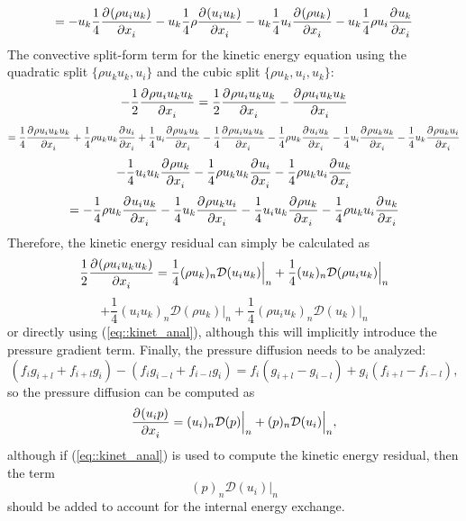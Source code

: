 \documentclass[12pt]{article}
\numberwithin{equation}{section}
\numberwithin{figure}{section}
\begin{document}
\begin{equation}
= -u_k\frac{1}{4}\frac{\partial^{} (\rho u_i u_k)}{\partial x_i^{}} -u_k\frac{1}{4}\rho\frac{\partial^{} (u_iu_k)}{\partial x_i^{}}
 -u_k\frac{1}{4}u_i\frac{\partial^{} (\rho u_k)}{\partial x_i^{}}
  -u_k\frac{1}{4}\rho u_i \frac{\partial^{} u_k}{\partial x_i^{}}
\end{equation}
\newcommand{\quadA}{\rho u_ku_k}
\newcommand{\quadB}{u_i}
\newcommand{\cubeA}{\rho u_k}
\newcommand{\cubeB}{u_i}
\newcommand{\cubeC}{u_k}
The convective split-form term for the kinetic energy equation using the quadratic split $\{\quadA{}, \quadB{}\}$ and the
cubic split $\{\cubeA{}, \cubeB{}, \cubeC{}\}$:
\begin{equation*}
-\frac{1}{2}\frac{\partial^{} \rho u_i u_k u_k}{\partial x_i^{}} = \frac{1}{2}\frac{\partial^{} \rho u_i u_k u_k}{\partial x_i^{}} - \frac{\partial^{} \rho u_i u_k u_k}{\partial x_i^{}}
\end{equation*}
\begin{equation*}
=\frac{1}{4}\pdv{\rho u_i u_k u_k}{x_i} + \frac{1}{4}\quadA{}\pdv{\quadB{}}{x_i} + \frac{1}{4}\quadB{}\pdv{\quadA{}}{x_i}
-\frac{1}{4}\pdv{\rho u_i u_k u_k}{x_i}
-\frac{1}{4}\cubeA{}\pdv{\cubeB{}\cubeC{}}{x_i}
-\frac{1}{4}\cubeB{}\pdv{\cubeA{}\cubeC{}}{x_i}
-\frac{1}{4}\cubeC{}\pdv{\cubeA{}\cubeB{}}{x_i}
\end{equation*}
\begin{equation*}
-\frac{1}{4}\cubeB{}\cubeC{}\pdv{\cubeA{}}{x_i}
-\frac{1}{4}\cubeA{}\cubeC{}\pdv{\cubeB{}}{x_i}
-\frac{1}{4}\cubeA{}\cubeB{}\pdv{\cubeC{}}{x_i}
\end{equation*}
\begin{equation}
=-\frac{1}{4}\cubeA{}\pdv{\cubeB{}\cubeC{}}{x_i}
-\frac{1}{4}\cubeC{}\pdv{\cubeA{}\cubeB{}}{x_i}
-\frac{1}{4}\cubeB{}\cubeC{}\pdv{\cubeA{}}{x_i}
-\frac{1}{4}\cubeA{}\cubeB{}\pdv{\cubeC{}}{x_i}
\end{equation}
Therefore, the kinetic energy residual can simply be calculated as
\begin{equation*}
\frac{1}{2}\frac{\partial^{} (\rho u_i u_k u_k)}{\partial x_i^{}} = \frac{1}{4}(\rho u_k)_n\mathcal{D}(u_i u_k)\Big|_n + \frac{1}{4}(u_k)_n\mathcal{D}(\rho u_i u_k)\Big|_n
\end{equation*}
\begin{equation}
+ \frac{1}{4}(u_iu_k)_n\mathcal{D}(\rho u_k)\Big|_n
+ \frac{1}{4}(\rho u_i u_k)_n\mathcal{D}(u_k)\Big|_n
\end{equation}
or directly using (\ref{eq::kinet_anal}), although this will implicitly introduce the pressure gradient term. Finally, the pressure diffusion needs to be analyzed:
\begin{equation}
(f_{i}g_{i+l} + f_{i+l}g_{i}) - (f_{i}g_{i-l} + f_{i-l}g_{i})
=
f_{i}(g_{i+l} - g_{i-l}) + g_{i}(f_{i+l} - f_{i - l}),
\end{equation}
so the pressure diffusion can be computed as
\begin{equation}
\frac{\partial^{} (u_i p)}{\partial x_i^{}} = (u_i)_n\mathcal{D}(p)\Big|_n + (p)_n\mathcal{D}(u_i)\Big|_n,
\end{equation}
although if (\ref{eq::kinet_anal}) is used to compute the kinetic energy residual, then the term 
\begin{equation}
(p)_n\mathcal{D}(u_i)\Big|_n
\end{equation}
should be added to account for the internal energy exchange.
\end{document}
